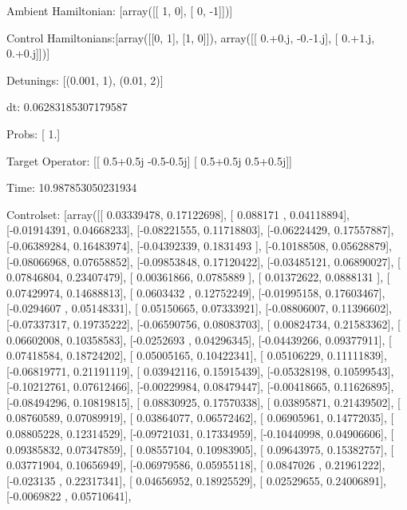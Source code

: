 \documentclass{article}
\begin{document}
    

\newpage

Ambient Hamiltonian: [array([[ 1,  0],
       [ 0, -1]])]

Control Hamiltonians:[array([[0, 1],
       [1, 0]]), array([[ 0.+0.j, -0.-1.j],
       [ 0.+1.j,  0.+0.j]])]

Detunings: [(0.001, 1), (0.01, 2)]

 dt: 0.06283185307179587

Probs: [ 1.]

Target Operator: [[ 0.5+0.5j -0.5-0.5j]
 [ 0.5+0.5j  0.5+0.5j]]

Time: 10.987853050231934

Controlset: [array([[ 0.03339478,  0.17122698],
       [ 0.088171  ,  0.04118894],
       [-0.01914391,  0.04668233],
       [-0.08221555,  0.11718803],
       [-0.06224429,  0.17557887],
       [-0.06389284,  0.16483974],
       [-0.04392339,  0.1831493 ],
       [-0.10188508,  0.05628879],
       [-0.08066968,  0.07658852],
       [-0.09853848,  0.17120422],
       [-0.03485121,  0.06890027],
       [ 0.07846804,  0.23407479],
       [ 0.00361866,  0.0785889 ],
       [ 0.01372622,  0.0888131 ],
       [ 0.07429974,  0.14688813],
       [ 0.0603432 ,  0.12752249],
       [-0.01995158,  0.17603467],
       [-0.0294607 ,  0.05148331],
       [ 0.05150665,  0.07333921],
       [-0.08806007,  0.11396602],
       [-0.07337317,  0.19735222],
       [-0.06590756,  0.08083703],
       [ 0.00824734,  0.21583362],
       [ 0.06602008,  0.10358583],
       [-0.0252693 ,  0.04296345],
       [-0.04439266,  0.09377911],
       [ 0.07418584,  0.18724202],
       [ 0.05005165,  0.10422341],
       [ 0.05106229,  0.11111839],
       [-0.06819771,  0.21191119],
       [ 0.03942116,  0.15915439],
       [-0.05328198,  0.10599543],
       [-0.10212761,  0.07612466],
       [-0.00229984,  0.08479447],
       [-0.00418665,  0.11626895],
       [-0.08494296,  0.10819815],
       [ 0.08830925,  0.17570338],
       [ 0.03895871,  0.21439502],
       [ 0.08760589,  0.07089919],
       [ 0.03864077,  0.06572462],
       [ 0.06905961,  0.14772035],
       [ 0.08805228,  0.12314529],
       [-0.09721031,  0.17334959],
       [-0.10440998,  0.04906606],
       [ 0.09385832,  0.07347859],
       [ 0.08557104,  0.10983905],
       [ 0.09643975,  0.15382757],
       [ 0.03771904,  0.10656949],
       [-0.06979586,  0.05955118],
       [ 0.0847026 ,  0.21961222],
       [-0.023135  ,  0.22317341],
       [ 0.04656952,  0.18925529],
       [ 0.02529655,  0.24006891],
       [-0.0069822 ,  0.05710641],
\end{document}
